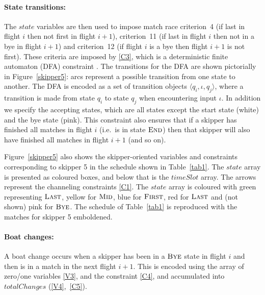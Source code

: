 \documentclass{llncs}
\newcommand{\timeSlot}{\mathit{timeSlot}}
\newcommand{\state}{\mathit{state}}
\newcommand{\totalChanges}{\mathit{totalChanges}}
\newcommand{\FIRST}{\textnormal{\textsc{First}}}
\newcommand{\MID}{\textnormal{\textsc{Mid}}}
\newcommand{\LAST}{\textnormal{\textsc{Last}}}
\newcommand{\END}{\textnormal{\textsc{End}}}
\newcommand{\BYE}{\textnormal{\textsc{Bye}}}
\begin{document}
\paragraph{State transitions:} The $\state$ variables are then used to impose match race criterion~4
(if last in flight $i$ then not first in flight $i+1$), criterion~11 (if last in flight $i$ then not
in a bye in flight $i+1$) and criterion~12 (if flight $i$ is a bye then flight $i+1$ is not first).
These criteria are imposed by \eqref{C3}, which is a deterministic finite automaton (DFA) constraint
\cite{Pesant04}. The transitions for the DFA are shown pictorially in Figure~\ref{skipper5}: arcs
represent a possible transition from one state to another. The DFA is encoded as a set of transition objects
$\langle q_{i},\iota,q_{j} \rangle$, where a transition is made from state $q_{i}$ to state $q_{j}$
when encountering input $\iota$. In addition we specify the accepting states, which are all states
except the start state (white) and the bye state (pink).  This constraint also ensures that if a
skipper has finished all matches in flight $i$ (i.e.\ is in state $\END$) then that skipper will also have
finished all matches in flight $i+1$ (and so on).

Figure~\ref{skipper5} also shows the skipper-oriented variables and constraints corresponding to
skipper 5 in the schedule shown in Table~\ref{tab1}. The $\state$ array is presented as coloured boxes, and
below that is the $\timeSlot$ array. The arrows represent the channeling constraints \eqref{C1}. The
$\state$ array is coloured with green representing $\LAST$, yellow for $\MID$, blue for $\FIRST$,
red for $\LAST$ and (not shown) pink for $\BYE$. The schedule of Table~\ref{tab1} is reproduced with
the matches for skipper 5 emboldened.

\paragraph{Boat changes:} A boat change occurs when a skipper has been in a $\BYE$ state in flight
$i$ and then is in a match in the next flight $i+1$.  This is encoded using the array of zero/one
variables \eqref{V3}, and the constraint \eqref{C4}, and accumulated into $\totalChanges$
(\ref{V4},~\ref{C5}).
\end{document}
